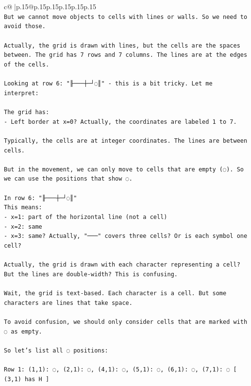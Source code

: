 \documentclass{article}
\begin{document}
{\begin{supertabular}{c@{$\;$}|p{.15\linewidth}@{}p{.15\linewidth}p{.15\linewidth}p{.15\linewidth}p{.15\linewidth}p{.15\linewidth}}
{{{\\ 
\texttt{But we cannot move objects to cells with lines or walls. So we need to avoid those.} \\
\\ 
\texttt{Actually, the grid is drawn with lines, but the cells are the spaces between. The grid has 7 rows and 7 columns. The lines are at the edges of the cells.} \\
\\ 
\texttt{Looking at row 6: "╟───┼─┘◌║" {-} this is a bit tricky. Let me interpret:} \\
\\ 
\texttt{The grid has:} \\
\texttt{{-} Left border at x=0? Actually, the coordinates are labeled 1 to 7.} \\
\\ 
\texttt{Typically, the cells are at integer coordinates. The lines are between cells.} \\
\\ 
\texttt{But in the movement, we can only move to cells that are empty (◌). So we can use the positions that show ◌.} \\
\\ 
\texttt{In row 6: "╟───┼─┘◌║"} \\
\texttt{This means:} \\
\texttt{{-} x=1: part of the horizontal line (not a cell)} \\
\texttt{{-} x=2: same} \\
\texttt{{-} x=3: same? Actually, "───" covers three cells? Or is each symbol one cell?} \\
\\ 
\texttt{Actually, the grid is drawn with each character representing a cell? But the lines are double{-}width? This is confusing.} \\
\\ 
\texttt{Wait, the grid is text{-}based. Each character is a cell. But some characters are lines that take space.} \\
\\ 
\texttt{To avoid confusion, we should only consider cells that are marked with ◌ as empty.} \\
\\ 
\texttt{So let's list all ◌ positions:} \\
\\ 
\texttt{Row 1: (1,1): ◌, (2,1): ◌, (4,1): ◌, (5,1): ◌, (6,1): ◌, (7,1): ◌  {[} (3,1) has H {]}} \\
\\ 
}}}
\end{supertabular}}
\end{document}
